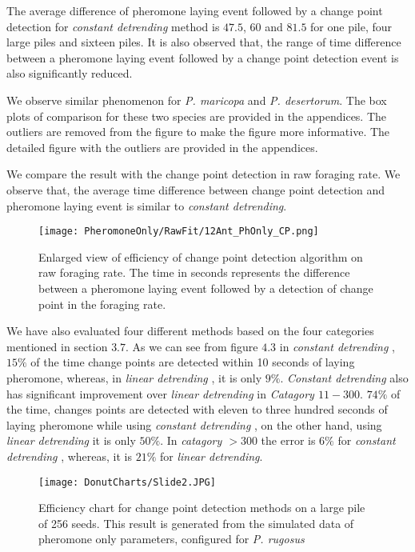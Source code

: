The average difference of pheromone laying event followed by a change point detection for \textit{constant detrending} method is $47.5$, $60$ and $81.5$ for one pile, four large piles and sixteen piles. It is also observed that, the range of time difference between a pheromone laying event followed by a change point detection event is also significantly reduced.\par 
We observe similar phenomenon for \textit{P. maricopa} and \textit{P. desertorum}. The box plots of comparison for these two species are provided in the appendices. The outliers are removed from the figure to make the figure more informative. The detailed figure with the outliers are provided in the appendices.\par 
We compare the result with the change point detection in raw foraging rate. We observe that, the average time difference between change point detection and pheromone laying event is similar to \textit{constant detrending}. \par
\begin{figure}[]
	\texttt{[image: PheromoneOnly/RawFit/12Ant\_PhOnly\_CP.png]}
	\caption{Enlarged view of efficiency of change point detection algorithm on raw foraging rate. The time in seconds represents the difference between a pheromone laying event followed by a detection of change point in the foraging rate.}
\end{figure}
We have also evaluated four different methods based on the four categories mentioned in section $3.7$.
As we can see from figure $4.3$ in \textit{constant detrending} , $15\%$ of the time change points are detected within 10 seconds of laying pheromone, whereas, in \textit{linear detrending} , it is only $9\%$. \textit{Constant detrending}  also has significant improvement over \textit{linear detrending}  in \textit{Catagory $11-300$}. $74\%$ of the time, changes points are detected with eleven to three hundred seconds of laying pheromone while using \textit{constant detrending} , on the other hand, using \textit{linear detrending} it is only $50\%$. In \textit{catagory $>300$} the error is $6\%$ for \textit{constant detrending} , whereas, it is $21\%$ for \textit{linear detrending}. \par
\begin{figure}[h]
	\texttt{[image: DonutCharts/Slide2.JPG]}
	\caption{Efficiency chart for change point detection methods on a large pile of 256 seeds. This result is generated from the simulated data of pheromone only parameters, configured for \textit{P. rugosus}}
\end{figure}

